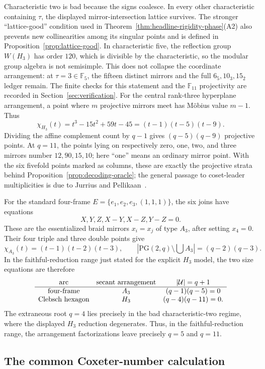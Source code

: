 \documentclass[11pt]{article}
\theoremstyle{definition}
\theoremstyle{remark}
\newcommand{\PG}{\mathrm{PG}}
\newcommand{\F}{\mathbb{F}}
\newcommand{\cU}{\mathcal{U}}
\begin{document}
Characteristic two is bad because the signs coalesce. In every other
characteristic containing $\tau$, the displayed mirror-intersection
lattice survives.  The stronger ``lattice-good'' condition used in
Theorem~\ref{thm:headline-rigidity-phase}(A2) also prevents new
collinearities among its singular points and is defined in
Proposition~\ref{prop:lattice-good}. In
characteristic five, the reflection group $W(H_3)$ has order $120$, which
is divisible by the characteristic, so the modular group algebra is not
semisimple. This does not collapse the coordinate arrangement:
at $\tau=3\in\F_5$, the fifteen distinct mirrors and the full
$6_5,10_3,15_2$ ledger remain. The finite checks for this statement and the
$\F_{11}$ projectivity are recorded in
Section~\ref{sec:verification}. For the central rank-three hyperplane
arrangement, a point where $m$ projective mirrors meet has M\"obius value
$m-1$. Thus
\[
 \chi_{H_3}(t)=t^3-15t^2+59t-45=(t-1)(t-5)(t-9).
\]
Dividing the affine complement count by $q-1$ gives $(q-5)(q-9)$
projective points. At $q=11$, the points lying on respectively zero, one,
two, and three mirrors number $12,90,15,10$; here ``one'' means an
ordinary mirror point. With the six fivefold points marked as columns,
these are exactly the projective strata behind
Proposition~\ref{prop:decoding-oracle}; the general passage to
coset-leader multiplicities is due to Jurrius and
Pellikaan~\cite{JurriusPellikaan2015}.

For the standard four-frame $E=\{e_1,e_2,e_3,(1,1,1)\}$, the six joins
have equations
\[
 X,Y,Z,X-Y,X-Z,Y-Z=0.
\]
These are the essentialized braid mirrors $x_i=x_j$ of type $A_3$, after
setting $x_4=0$. Their four triple and three double points give
\[
 \chi_{A_3}(t)=(t-1)(t-2)(t-3),\qquad
 |\PG(2,q)\setminus\textstyle\bigcup A_3|=(q-2)(q-3).
\]
In the faithful-reduction range just stated for the explicit $H_3$ model,
the two size equations are therefore
\[
\begin{array}{c@{\quad}c@{\quad}c}
\text{arc}&\text{secant arrangement}&|\cU|=q+1\\ \hline
\text{four-frame}&A_3&(q-1)(q-5)=0\\
\text{Clebsch hexagon}&H_3&(q-4)(q-11)=0.
\end{array}
\]
The extraneous root $q=4$ lies precisely in the bad characteristic-two
regime, where the displayed $H_3$ reduction degenerates. Thus, in the
faithful-reduction range, the arrangement factorizations leave precisely
$q=5$ and $q=11$.

\subsection{The common Coxeter-number calculation}
\label{sec:coxeter-number-phase}
\end{document}
